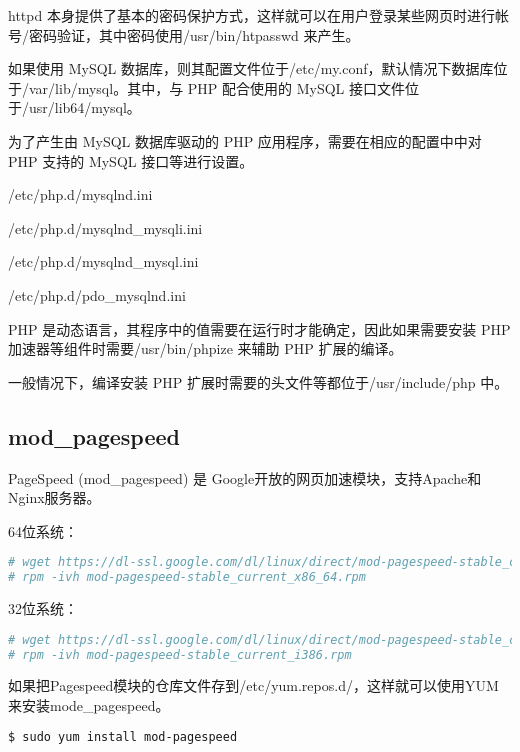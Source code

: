 httpd 本身提供了基本的密码保护方式，这样就可以在用户登录某些网页时进行帐号/密码验证，其中密码使用/usr/bin/htpasswd 来产生。

如果使用 MySQL 数据库，则其配置文件位于/etc/my.conf，默认情况下数据库位于/var/lib/mysql。其中，与 PHP 配合使用的 MySQL 接口文件位于/usr/lib64/mysql。

为了产生由 MySQL 数据库驱动的 PHP 应用程序，需要在相应的配置中中对 PHP 支持的 MySQL 接口等进行设置。

\begin{compactitem}
\item /etc/php.d/mysqlnd.ini
\item /etc/php.d/mysqlnd_mysqli.ini
\item /etc/php.d/mysqlnd_mysql.ini
\item /etc/php.d/pdo_mysqlnd.ini
\end{compactitem}

PHP 是动态语言，其程序中的值需要在运行时才能确定，因此如果需要安装 PHP 加速器等组件时需要/usr/bin/phpize 来辅助 PHP 扩展的编译。

一般情况下，编译安装 PHP 扩展时需要的头文件等都位于/usr/include/php 中。


\subsection{mod\_pagespeed}


PageSpeed (mod\_pagespeed) 是 Google开放的网页加速模块，支持Apache和Nginx服务器。 

64位系统：

\begin{lstlisting}[language=bash]
# wget https://dl-ssl.google.com/dl/linux/direct/mod-pagespeed-stable_current_x86_64.rpm
# rpm -ivh mod-pagespeed-stable_current_x86_64.rpm
\end{lstlisting}

32位系统：


\begin{lstlisting}[language=bash]
# wget https://dl-ssl.google.com/dl/linux/direct/mod-pagespeed-stable_current_i386.rpm
# rpm -ivh mod-pagespeed-stable_current_i386.rpm
\end{lstlisting}


如果把Pagespeed模块的仓库文件存到/etc/yum.repos.d/，这样就可以使用YUM来安装mode\_pagespeed。

\begin{lstlisting}[language=bash]
$ sudo yum install mod-pagespeed
\end{lstlisting}


